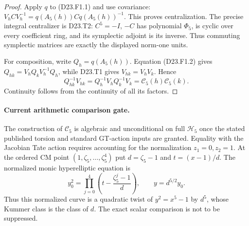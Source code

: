 \begin{proof}
Apply $q$ to (D23.F1.1) and use covariance:
$V_h C V_h^{-1}=q(A_5(h))Cq(A_5(h))^{-1}$.
This proves centralization.  The precise integral centralizer
is D23.T2: $C^5=-I$, $-C$ has polynomial $\Phi_5$, is cyclic
over every coefficient ring, and its symplectic adjoint is its
inverse.  Thus commuting symplectic matrices are exactly the
displayed norm-one units.

For composition, write $Q_h=q(A_5(h))$.  Equation (D23.F1.2)
gives $Q_{hk}=V_hQ_kV_h^{-1}Q_h$, while D23.T1 gives
$V_{hk}=V_hV_k$.  Hence
\[
 Q_{hk}^{-1}V_{hk}
 =Q_h^{-1}V_hQ_k^{-1}V_k
 =\mathcal C_5(h)\mathcal C_5(k).
\]
Continuity follows from the continuity of all its factors.
\end{proof}

\paragraph{Current arithmetic comparison gate.}
The construction of $\mathcal C_5$ is algebraic and unconditional
on full $\mathcal H_5$ once the stated published torsion and
standard GT-action inputs are granted.  Equality with the
Jacobian Tate action requires accounting for the normalization
$z_1=0,z_2=1$.  At the ordered CM point
$(1,\zeta_5,\ldots,\zeta_5^4)$ put $d=\zeta_5-1$ and
$t=(x-1)/d$.  The normalized monic hyperelliptic equation is
\[
 y_0^2=\prod_{j=0}^{4}
 \left(t-\frac{\zeta_5^j-1}{d}\right),
 \qquad y=d^{5/2}y_0.
\]
Thus this normalized curve is a quadratic twist of
$y^2=x^5-1$ by $d^5$, whose Kummer class is the class of $d$.
The exact scalar comparison is not to be suppressed.
